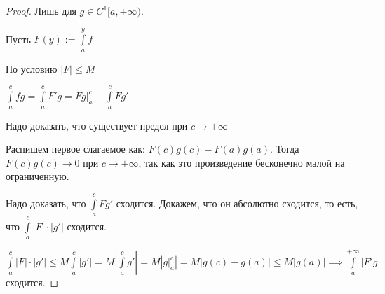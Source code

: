\begin{proof} \thmslashn

    Лишь для $g \in C^1[a,+\infty)$.
    
    Пусть $F(y) := \int\limits_a^y f$
    
    По условию $|F| \le M$
    
    $\int\limits_a^c fg = \int\limits_a^c F'g =  \left. Fg \right|_a^c - \int\limits_a^c Fg'$
    
    Надо доказать, что существует предел при  $c \to +\infty$
    
    Распишем первое слагаемое как: $F(c)g(c) - F(a)g(a)$. Тогда $F(c)g(c) \to 0$ при $c \to +\infty$, так как это произведение бесконечно малой на ограниченную.
    
    Надо доказать, что $\int\limits_a^c Fg'$ сходится. Докажем, что он абсолютно сходится, то есть, что $\int\limits_a^c |F| \cdot |g'|$ сходится. 
    
    $\int\limits_a^c |F| \cdot |g'| \le M \int\limits_a^c |g'| = M |\int\limits_a^c g'| = M | \left. g \right|_a^c | = M|g(c) - g(a)| \le M|g(a)| \implies \int\limits_a^{+\infty} |F'g|$ сходится.
    
    
\end{proof}

